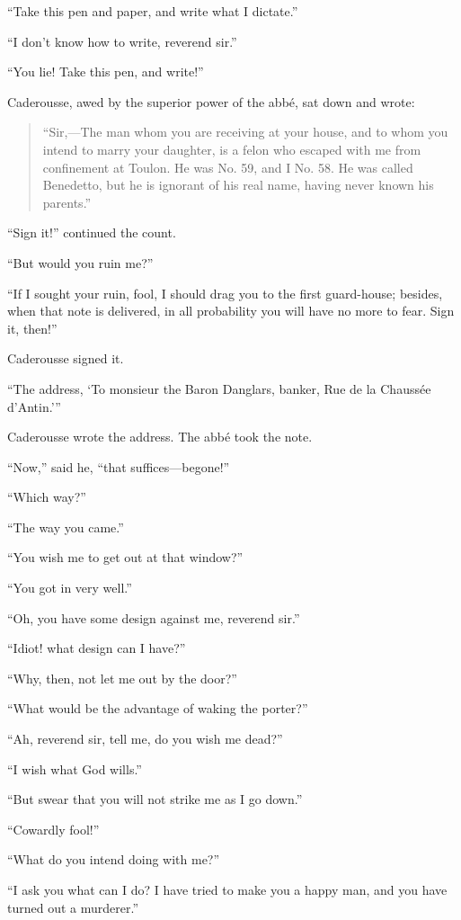 “Take this pen and paper, and write what I dictate.”

“I don’t know how to write, reverend sir.”

“You lie! Take this pen, and write!”

Caderousse, awed by the superior power of the abbé, sat down and wrote:

\begin{quote}
{\small“Sir,—The man whom you are receiving at your house, and to whom you
intend to marry your daughter, is a felon who escaped with me from
confinement at Toulon. He was No. 59, and I No. 58. He was called
Benedetto, but he is ignorant of his real name, having never known his
parents.”}
\end{quote}

“Sign it!” continued the count.

“But would you ruin me?”

“If I sought your ruin, fool, I should drag you to the first
guard-house; besides, when that note is delivered, in all probability
you will have no more to fear. Sign it, then!”

Caderousse signed it.

“The address, ‘To monsieur the Baron Danglars, banker, Rue de la
Chaussée d’Antin.’”

Caderousse wrote the address. The abbé took the note.

“Now,” said he, “that suffices—begone!”

“Which way?”

“The way you came.”

“You wish me to get out at that window?”

“You got in very well.”

“Oh, you have some design against me, reverend sir.”

“Idiot! what design can I have?”

“Why, then, not let me out by the door?”

“What would be the advantage of waking the porter?”

“Ah, reverend sir, tell me, do you wish me dead?”

“I wish what God wills.”

“But swear that you will not strike me as I go down.”

“Cowardly fool!”

“What do you intend doing with me?”

“I ask you what can I do? I have tried to make you a happy man, and you
have turned out a murderer.”


